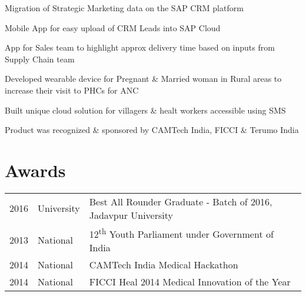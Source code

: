 \documentclass[]{deedy-resume-openfont}
\begin{document}
\begin{minipage}[t]{0.66\textwidth}
\begin{tightemize}
\item Migration of Strategic Marketing data on the SAP CRM platform
\item Mobile App for easy upload of CRM Leads into SAP Cloud
\item App for Sales team to highlight approx delivery time based on inputs from Supply Chain team
\end{tightemize}
\sectionsep

\begin{tightemize}
\item Developed wearable device for Pregnant \& Married woman in Rural areas to increase their visit to PHCs for ANC
\item Built unique cloud solution for villagers \& healt workers accessible using SMS
\item Product was recognized \& sponsored by CAMTech India, FICCI \& Terumo India
\end{tightemize}
\sectionsep


\section{Awards} 
\begin{tabular}{rll}
2016	     & University  & Best All Rounder Graduate - Batch of 2016, Jadavpur University\\
2013     & National & 12\textsuperscript{th} Youth Parliament under Government of India  \\
2014	     & National  & CAMTech India Medical Hackathon\\
2014	     & National  & FICCI Heal 2014 Medical Innovation of the Year\\
\end{tabular}
\sectionsep

\end{minipage} 
\end{document}

